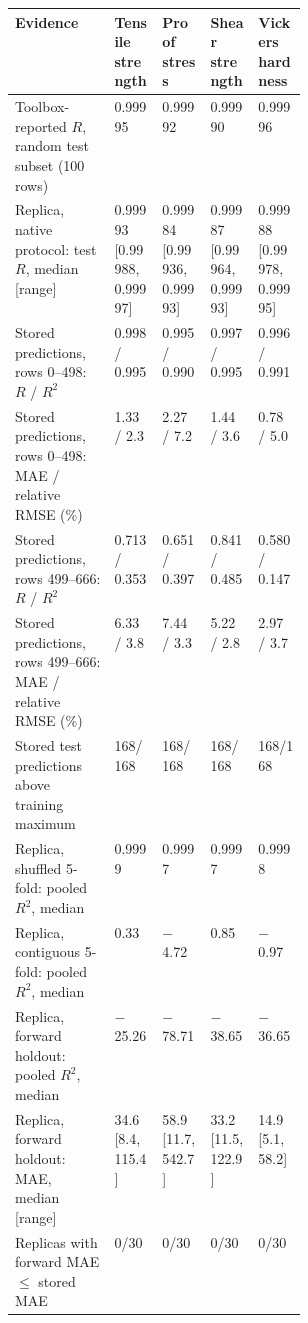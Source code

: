 \begin{tabular}{@{}p{0.34\linewidth}llll@{}}
\toprule
Evidence & Tensile strength & Proof stress & Shear strength & Vickers hardness \\
\midrule
Toolbox-reported $R$, random test subset (100 rows) & 0.99995 & 0.99992 & 0.99990 & 0.99996 \\
Replica, native protocol: test $R$, median [range] & 0.99993 [0.99988, 0.99997] & 0.99984 [0.99936, 0.99993] & 0.99987 [0.99964, 0.99993] & 0.99988 [0.99978, 0.99995] \\
Stored predictions, rows 0--498: $R$ / $R^2$ & 0.998 / 0.995 & 0.995 / 0.990 & 0.997 / 0.995 & 0.996 / 0.991 \\
Stored predictions, rows 0--498: MAE / relative RMSE (\%) & 1.33 / 2.3 & 2.27 / 7.2 & 1.44 / 3.6 & 0.78 / 5.0 \\
Stored predictions, rows 499--666: $R$ / $R^2$ & 0.713 / 0.353 & 0.651 / 0.397 & 0.841 / 0.485 & 0.580 / 0.147 \\
Stored predictions, rows 499--666: MAE / relative RMSE (\%) & 6.33 / 3.8 & 7.44 / 3.3 & 5.22 / 2.8 & 2.97 / 3.7 \\
Stored test predictions above training maximum & 168/168 & 168/168 & 168/168 & 168/168 \\
Replica, shuffled 5-fold: pooled $R^2$, median & 0.9999 & 0.9997 & 0.9997 & 0.9998 \\
Replica, contiguous 5-fold: pooled $R^2$, median & 0.33 & $-$4.72 & 0.85 & $-$0.97 \\
Replica, forward holdout: pooled $R^2$, median & $-$25.26 & $-$78.71 & $-$38.65 & $-$36.65 \\
Replica, forward holdout: MAE, median [range] & 34.6 [8.4, 115.4] & 58.9 [11.7, 542.7] & 33.2 [11.5, 122.9] & 14.9 [5.1, 58.2] \\
Replicas with forward MAE $\le$ stored MAE & 0/30 & 0/30 & 0/30 & 0/30 \\
\bottomrule
\end{tabular}
